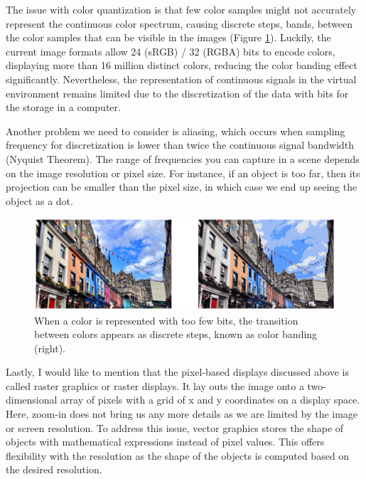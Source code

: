 


The issue with color quantization is that few color samples might not accurately represent the continuous color spectrum, causing discrete steps, bands, between the color samples that can be visible in the images (Figure \ref{fig:color-band}). Luckily, the current image formats allow 24 (sRGB) / 32 (RGBA) bits to encode colors, displaying more than 16 million distinct colors, reducing the color banding effect significantly. Nevertheless, the representation of continuous signals in the virtual environment remains limited due to the discretization of the data with bits for the storage in a computer.

Another problem we need to consider is aliasing, which occurs when sampling frequency for discretization is lower than twice the continuous signal bandwidth (Nyquist Theorem). The range of frequencies you can capture in a scene depends on the image resolution or pixel size. For instance, if an object is too far, then its projection can be smaller than the pixel size, in which case we end up seeing the object as a dot.



\begin{figure}
  \centering
    \includegraphics[width=0.9\linewidth]{Images/color_quantization.png}

    \caption{When a color is represented with too few bits, the transition between colors appears as discrete steps, known as color banding (right).}\label{fig:color-band}
\end{figure} 



Lastly, I would like to mention that the pixel-based displays discussed above is called raster graphics or raster displays. It lay outs the image onto a two-dimensional array of pixels with a grid of x and y coordinates on a display space. Here, zoom-in does not bring us any more details as we are limited by the image or screen resolution. To address this issue, vector graphics stores the shape of objects with mathematical expressions instead of pixel values. This offers flexibility with the resolution as the shape of the objects is computed based on the desired resolution.

